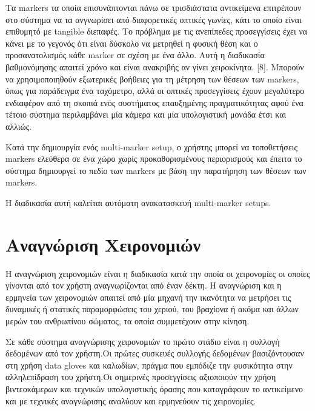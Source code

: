 Τα markers τα οποία επισυνάπτονται πάνω σε τρισδιάστατα αντικείμενα επιτρέπουν στο σύστημα να τα ανγνωρίσει από διαφορετικές οπτικές γωνίες, κάτι το οποίο είναι επιθυμητό με tangible διεπαφές.
Το πρόβλημα με τις ανεπίπεδες προσεγγίσεις έχει να κάνει με το γεγονός ότι είναι δύσκολο να μετρηθεί η φυσική θέση και ο προσανατολισμός κάθε marker σε σχέση με ένα άλλο.
Αυτή η διαδικασία βαθμονόμησης απαιτεί χρόνο και είναι ανακριβής αν γίνει χειροκίνητα. [8]. Μπορούν να χρησιμοποιηθούν εξωτερικές βοήθειες για τη μέτρηση των θέσεων των markers, όπως για παράδειγμα ένα ταχόμετρο, αλλά οι οπτικές προσεγγίσεις έχουν μεγαλύτερο ενδιαφέρον από τη σκοπιά ενός συστήματος επαυξημένης πραγματικότητας αφού ένα τέτοιο σύστημα περιλαμβάνει μία κάμερα και μία υπολογιστική μονάδα έτσι και αλλιώς.

Κατά την δημιουργία ενός multi-marker setup, ο χρήστης μπορεί να τοποθετήσεις markers ελεύθερα σε ένα χώρο χωρίς προκαθορισμένους περιορισμούς και έπειτα το σύστημα δημιουργεί το πεδίο των markers με βάση την παρατήρηση των θέσεων των markers.

Η διαδικασία αυτή καλείται αυτόματη ανακατασκευή multi-marker setups.






\section{Αναγνώριση Χειρονομιών}



H αναγνώριση χειρονομιών είναι η διαδικασία κατά την οποία οι χειρονομίες οι οποίες γίνονται από τον χρήστη αναγνωρίζονται από έναν δέκτη. Η αναγνώριση και η ερμηνεία των χειρονομιών απαιτεί από μία μηχανή την ικανότητα να μετρήσει τις δυναμικές ή στατικές παραμορφώσεις του χεριού, του βραχίονα ή ακόμα και άλλων μερών του ανθρωπίνου σώματος, τα οποία συμμετέχουν στην κίνηση.

Σε κάθε σύστημα αναγνώρισης χειρονομιών το πρώτο στάδιο είναι η συλλογή δεδομένων από τον χρήστη.Οι πρώτες συσκευές συλλογής δεδομένων βασιζόντουσαν στη χρήση data gloves και καλωδίων, πράγμα που εμπόδιζε την φυσικότητα στην αλληλεπίδραση του χρήστη.Οι σημερινές προσεγγίσεις αξιοποιούν την χρήση βιντεοκάμερων και τεχνικών υπολογιστικής όρασης που καταγράφουν το αντικείμενο και με τεχνικές αναγνώρισης αναλύουν και ερμηνεύουν τις χειρονομίες.

